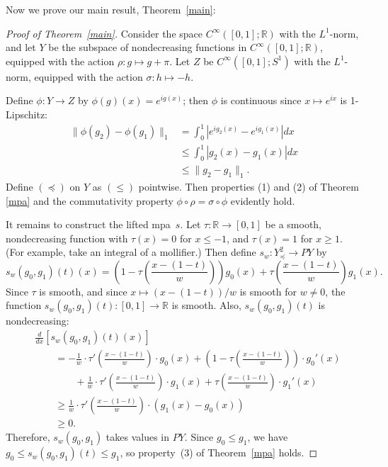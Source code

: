 \documentclass[11pt, reqno, english]{amsart}
\theoremstyle{plain}
\theoremstyle{definition}
\newcommand{\R}{\mathbb{R}}
\begin{document}
Now we prove our main result, Theorem~\ref{main}:

\begin{proof}[Proof of Theorem~\ref{main}]
  Consider the space $C^{\infty}([0, 1]; \R)$ with the $L^{1}$-norm, and let
  $Y$ be the subspace of nondecreasing functions in $C^{\infty}([0, 1]; \R)$,
  equipped with the action $\rho\colon g \mapsto g + \pi$. Let $Z$ be
  $C^{\infty}([0, 1]; S^{1})$ with the $L^{1}$-norm, equipped with the action
  $\sigma\colon h \mapsto -h$.
  
  Define $\phi\colon Y \rightarrow Z$ by $\phi(g)(x) = e^{ig(x)}$; then $\phi$
  is continuous since $x \mapsto e^{ix}$ is 1-Lipschitz:
  \begin{align*}
    \|\phi(g_{2}) - \phi(g_{1})\|_{1} &= \int_{0}^{1}|e^{ig_{2}(x)} -
    e^{ig_{1}(x)}|dx\\
    &\le \int_{0}^{1}|g_{2}(x) - g_{1}(x)|dx\\
    &\le \|g_{2} - g_{1}\|_{1}.
  \end{align*}
  Define $(\preceq)$ on $Y$ as $(\le)$ pointwise. Then properties (1) and (2) of Theorem
  \ref{mpa} and the commutativity property $\phi \circ \rho = \sigma \circ
  \phi$
  evidently hold.
  
  It remains to construct the lifted mpa~$s$. Let $\tau\colon \R \rightarrow
  [0, 1]$ be a smooth, nondecreasing function with $\tau(x) = 0$ for $x \le
  -1$, and $\tau(x) = 1$ for $x \ge 1$. (For example, take an integral of a
  mollifier.) Then define $s_{w}\colon Y_{\preceq}^{2} \rightarrow PY$ by
  $$s_{w}(g_{0}, g_{1})(t)(x) = \left(1 - \tau\left(\frac{x - (1 -
  t)}{w}\right)\right)g_{0}(x) + \tau\left(\frac{x - (1 -
  t)}{w}\right)g_{1}(x).$$
  Since $\tau$ is smooth, and since $x \mapsto (x - (1 - t))/w$ is smooth for
  $w \ne 0$, the function $s_{w}(g_{0}, g_{1})(t)\colon [0, 1] \rightarrow \R$
  is smooth. Also, $s_{w}(g_{0}, g_{1})(t)$ is nondecreasing:
  \begin{align*}
    &\frac{d}{dx}[s_{w}(g_{0}, g_{1})(t)(x)]\\
    &\qquad = -\frac{1}{w} \cdot \tau'\left(\frac{x - (1 - t)}{w}\right) \cdot
    g_{0}(x) + \left(1 - \tau\left(\frac{x - (1 - t)}{w}\right)\right) \cdot
    g_{0}'(x)\\
    &\qquad\qquad + \frac{1}{w}\cdot\tau'\left(\frac{x - (1 -
    t)}{w}\right) \cdot g_{1}(x) + \tau\left(\frac{x - (1 - t)}{w}\right) \cdot
    g_{1}'(x)\\
    &\qquad \ge \frac{1}{w}\cdot\tau'\left(\frac{x - (1 - t)}{w}\right) \cdot
    (g_{1}(x) - g_{0}(x))\\
    &\qquad \ge 0.
  \end{align*}
  Therefore, $s_{w}(g_{0}, g_{1})$ takes values in $PY$. Since $g_{0} \le
  g_{1}$, we have $g_{0} \le s_{w}(g_{0}, g_{1})(t) \le g_{1}$, so property~(3)
  of Theorem~\ref{mpa} holds.


\end{proof}
\end{document}
